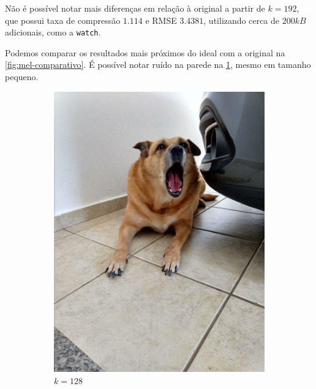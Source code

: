 \documentclass[brazilian,a4paper,twocolumn]{article}
\begin{document}
        Não é possível notar mais diferenças em relação à original a partir de $k=192$, que possui taxa de compressão $1.114$ e RMSE $3.4381$, utilizando cerca de $200kB$ adicionais, como a \texttt{watch}.

        Podemos comparar os resultados mais próximos do ideal com a original na \cref{fig:mel-comparativo}. É possível notar ruído na parede na \cref{fig:mel-128}, mesmo em tamanho pequeno.

        \begin{figure}[H]
            \centering
            \begin{subfigure}{0.15\textwidth}
                \includegraphics[width=\textwidth,keepaspectratio]{mel-128}
                \caption{$k=128$}
                \label{fig:mel-128}
            \end{subfigure}
            \begin{subfigure}{0.15\textwidth}

\end{subfigure}
\end{figure}
\end{document}
